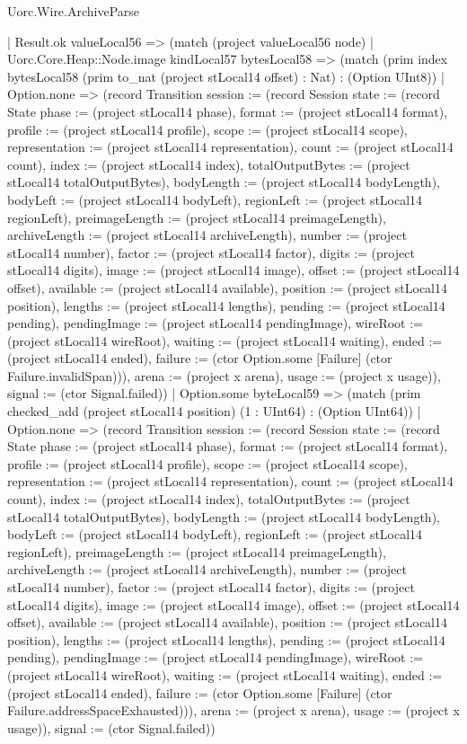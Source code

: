 \begin{lexlean}{Uorc.Wire.ArchiveParse}
\begin{semanticmodule}
{          | Result.ok valueLocal56 => (match (project valueLocal56 node)
            | Uorc.Core.Heap::Node.image kindLocal57 bytesLocal58 => (match (prim index bytesLocal58 (prim to_nat (project stLocal14 offset) : Nat) : (Option UInt8))
              | Option.none => (record Transition {session := (record Session {state := (record State {phase := (project stLocal14 phase), format := (project stLocal14 format), profile := (project stLocal14 profile), scope := (project stLocal14 scope), representation := (project stLocal14 representation), count := (project stLocal14 count), index := (project stLocal14 index), totalOutputBytes := (project stLocal14 totalOutputBytes), bodyLength := (project stLocal14 bodyLength), bodyLeft := (project stLocal14 bodyLeft), regionLeft := (project stLocal14 regionLeft), preimageLength := (project stLocal14 preimageLength), archiveLength := (project stLocal14 archiveLength), number := (project stLocal14 number), factor := (project stLocal14 factor), digits := (project stLocal14 digits), image := (project stLocal14 image), offset := (project stLocal14 offset), available := (project stLocal14 available), position := (project stLocal14 position), lengths := (project stLocal14 lengths), pending := (project stLocal14 pending), pendingImage := (project stLocal14 pendingImage), wireRoot := (project stLocal14 wireRoot), waiting := (project stLocal14 waiting), ended := (project stLocal14 ended), failure := (ctor Option.some [Failure] (ctor Failure.invalidSpan))}), arena := (project x arena), usage := (project x usage)}), signal := (ctor Signal.failed)})
              | Option.some byteLocal59 => (match (prim checked_add (project stLocal14 position) (1 : UInt64) : (Option UInt64))
                | Option.none => (record Transition {session := (record Session {state := (record State {phase := (project stLocal14 phase), format := (project stLocal14 format), profile := (project stLocal14 profile), scope := (project stLocal14 scope), representation := (project stLocal14 representation), count := (project stLocal14 count), index := (project stLocal14 index), totalOutputBytes := (project stLocal14 totalOutputBytes), bodyLength := (project stLocal14 bodyLength), bodyLeft := (project stLocal14 bodyLeft), regionLeft := (project stLocal14 regionLeft), preimageLength := (project stLocal14 preimageLength), archiveLength := (project stLocal14 archiveLength), number := (project stLocal14 number), factor := (project stLocal14 factor), digits := (project stLocal14 digits), image := (project stLocal14 image), offset := (project stLocal14 offset), available := (project stLocal14 available), position := (project stLocal14 position), lengths := (project stLocal14 lengths), pending := (project stLocal14 pending), pendingImage := (project stLocal14 pendingImage), wireRoot := (project stLocal14 wireRoot), waiting := (project stLocal14 waiting), ended := (project stLocal14 ended), failure := (ctor Option.some [Failure] (ctor Failure.addressSpaceExhausted))}), arena := (project x arena), usage := (project x usage)}), signal := (ctor Signal.failed)})
}
\end{semanticmodule}
\end{lexlean}
